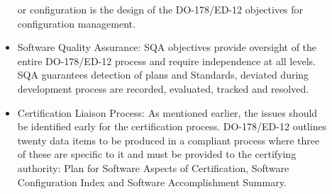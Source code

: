\begin{description}
\begin{itemize}
or configuration is the design of the DO-178/ED-12 objectives
for configuration management.
\item Software Quality Assurance: \ac{SQA} objectives provide oversight of the entire DO-178/ED-12
process and require independence at all levels. \ac{SQA} guarantees
detection of plans and Standards, deviated during development
process are recorded, evaluated, tracked and resolved.
\item Certification Liaison Process: As mentioned earlier, the
issues should be identified early for the certification process.
DO-178/ED-12 outlines twenty data items to be produced in a
compliant process where three of these are specific to it and
must be provided to the certifying authority: Plan for Software Aspects of Certification, Software Configuration Index and Software Accomplishment Summary.
\end{itemize}
\end{description}
